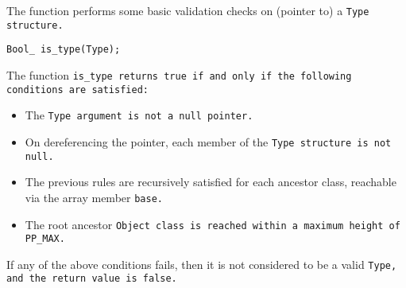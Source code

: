 The function  performs some basic
validation checks on (pointer to) a \tt{Type} structure.


\tt{Bool_ is_type(Type);}


The function \tt{is_type} returns \tt{true} if and
only if the following conditions are satisfied:

\begin{itemize}

\item The \tt{Type} argument is not a null pointer.

\item On dereferencing the pointer, each
member of the \tt{Type} structure is not null.

\item The previous rules are recursively satisfied for each
ancestor class, reachable via the array member \tt{base}.

\item The root ancestor \tt{Object} class is
reached within a maximum height of \tt{PP_MAX}.

\end{itemize}

If any of the above conditions fails, then it is not considered
to be a valid \tt{Type}, and the return value is \tt{false}.
